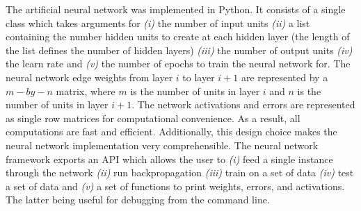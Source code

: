 The artificial neural network was implemented in Python.
It consists of a single class which takes arguments for {\em (i)} the number of input units {\em (ii)} a list containing the number hidden units to create at each hidden layer (the length of the list defines the number of hidden layers) {\em (iii)} the number of output units {\em (iv)} the learn rate and {\em (v)} the number of epochs to train the neural network for.
The neural network edge weights from layer \(i\) to layer \(i+1\) are represented by a \(m-by-n\) matrix, where \(m\) is the number of units in layer \(i\) and \(n\) is the number of units in layer \(i+1\).
The network activations and errors are represented as single row matrices for computational convenience. 
As a result, all computations are fast and efficient.
Additionally, this design choice makes the neural network implementation very comprehensible.
The neural network framework exports an API which allows the user to {\em (i)} feed a single instance through the network {\em (ii)} run backpropagation {\em (iii)} train on a set of data {\em (iv)} test a set of data and {\em (v)} a set of functions to print weights, errors, and activations.
The latter being useful for debugging from the command line.
 


